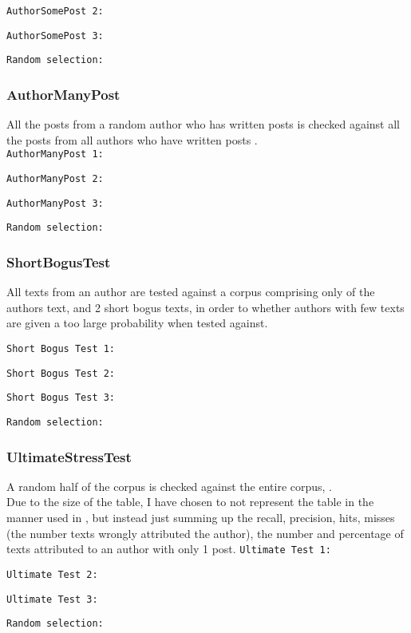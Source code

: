 \texttt{AuthorSomePost 2:}\nl
\nl

\texttt{AuthorSomePost 3:}\nl
\nl

\texttt{Random selection:}\nl


\subsubsection{AuthorManyPost}
All the posts from a random author who has written  posts is checked against all the posts from all authors who have written  posts .\\  

\texttt{AuthorManyPost 1:}\nl
\nl

\texttt{AuthorManyPost 2:}\nl
\nl

\texttt{AuthorManyPost 3:}\nl
\nl

\texttt{Random selection:}\nl


\subsubsection{ShortBogusTest}
All texts from an author are tested against a corpus comprising only of the authors text, and 2 short bogus texts, in order to whether authors with few texts are given a too large probability when tested against. 

\texttt{Short Bogus Test 1:}\nl
\nl

\texttt{Short Bogus Test 2:}\nl
\nl

\texttt{Short Bogus Test 3:}\nl
\nl

\texttt{Random selection:}\nl


\subsubsection{UltimateStressTest}
A random half of the corpus is checked against the entire corpus, .\\
Due to the size of the table, I have chosen to not represent the table in the manner used in \cite{nr4}, but instead just summing up the recall, precision, hits, misses (the number texts wrongly attributed the author), the number and percentage of texts attributed to an author with only 1 post.
\clearpage
\texttt{Ultimate Test 1:}\nl


\clearpage
\texttt{Ultimate Test 2:}\nl



\clearpage
\texttt{Ultimate Test 3:}\nl


\clearpage
\texttt{Random selection:}\nl

